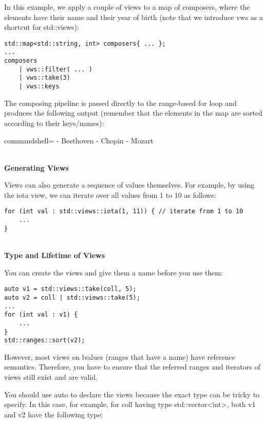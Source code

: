In this example, we apply a couple of views to a map of composers, where the elements have their name and their year of birth (note that we introduce vws as a shortcut for std::views):

\begin{lstlisting}[style=styleCXX]
std::map<std::string, int> composers{ ... };
...
composers
	| vws::filter( ... )
	| vws::take(3)
	| vws::keys
\end{lstlisting}

The composing pipeline is passed directly to the range-based for loop and produces the following output (remember that the elements in the map are sorted according to their keys/names):

\begin{tcblisting}{commandshell={}}
- Beethoven
- Chopin
- Mozart
\end{tcblisting}

\noindent
\hspace*{\fill} \\ %
\textbf{Generating Views}

Views can also generate a sequence of values themselves. For example, by using the iota view, we can iterate over all values from 1 to 10 as follows:

\begin{lstlisting}[style=styleCXX]
for (int val : std::views::iota(1, 11)) { // iterate from 1 to 10
	...
}
\end{lstlisting}

\noindent
\hspace*{\fill} \\ %
\textbf{Type and Lifetime of Views}

You can create the views and give them a name before you use them:

\begin{lstlisting}[style=styleCXX]
auto v1 = std::views::take(coll, 5);
auto v2 = coll | std::views::take(5);
...
for (int val : v1) {
	...
}
std::ranges::sort(v2);
\end{lstlisting}

However, most views on lvalues (ranges that have a name) have reference semantics. Therefore, you have to ensure that the referred ranges and iterators of views still exist and are valid.

You should use auto to declare the views because the exact type can be tricky to specify. In this case, for example, for coll having type std::vector<int>, both v1 and v2 have the following type:

